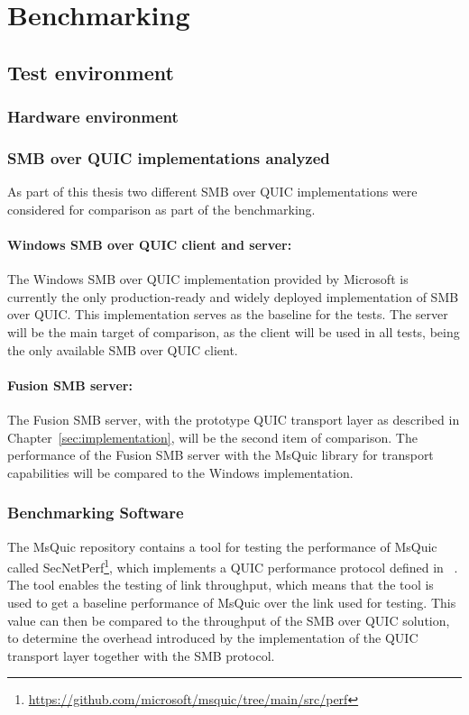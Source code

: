 \documentclass[english, 12pt, a4paper, elec, utf8, a-2b, online]{aaltothesis}
\begin{document}
\clearpage
\section{Benchmarking}
\label{sec:benchmark}
\subsection{Test environment}

\subsubsection{Hardware environment}

\subsubsection{SMB over QUIC implementations analyzed}
As part of this thesis two different SMB over QUIC implementations were considered
for comparison as part of the benchmarking.
\paragraph{Windows SMB over QUIC client and server:}

The Windows SMB over QUIC implementation provided by Microsoft is currently
the only production-ready and widely deployed implementation of SMB over QUIC. This implementation
serves as the baseline for the tests. The server will be the main target of comparison,
as the client will be used in all tests, being the only available SMB over QUIC client.

\paragraph{Fusion SMB server:}

The Fusion SMB server, with the prototype QUIC transport layer as described in
Chapter~\ref{sec:implementation}, will be the second item of comparison. The performance
of the Fusion SMB server with the MsQuic library for transport capabilities will
be compared to the Windows implementation.

\subsubsection{Benchmarking Software}
The MsQuic repository contains a tool for testing the performance of MsQuic called
SecNetPerf\footnote{\url{https://github.com/microsoft/msquic/tree/main/src/perf}},
which implements a QUIC performance protocol defined in ~\cite{banks-quic-performance-00}.
The tool enables the testing of link throughput, which means that the tool is used
to get a baseline performance of MsQuic over the link used for testing. This value can then
be compared to the throughput of the SMB over QUIC solution, to determine the overhead
introduced by the implementation of the QUIC transport layer together with the SMB protocol.
\end{document}
